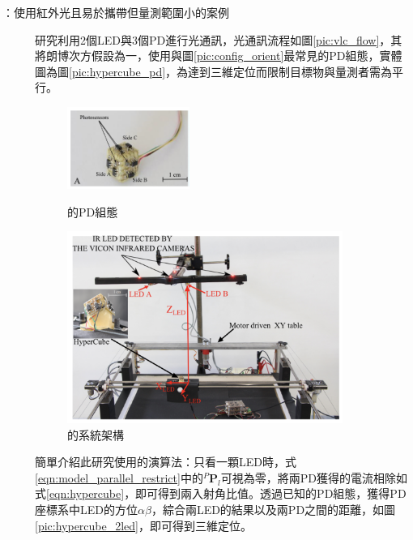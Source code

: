     \begin{description}
        \item[\cite{case:hypercube}：使用紅外光且易於攜帶但量測範圍小的案例]\hfill 
        
        \qquad
        \cite{case:hypercube}研究利用2個LED與3個PD進行光通訊，光通訊流程如圖\ref{pic:vlc_flow}，其將朗博次方假設為一，使用與圖\ref{pic:config_orient}最常見的PD組態，實體圖為圖\ref{pic:hypercube_pd}，為達到三維定位而限制目標物與量測者需為平行。

        \begin{figure}[!htb]
            \centering
            \begin{minipage}{.17\textwidth}
                \centering
                \includegraphics[width=4cm]{ch2pic/hypercube_pd.png}
                \caption{\cite{case:hypercube}的PD組態}
                \label{pic:hypercube_pd}
            \end{minipage}%
            \begin{minipage}{0.5\textwidth}
                \centering
                \includegraphics[width=9cm]{ch2pic/hypercube_setup.png}
                \caption{\cite{case:hypercube}的系統架構}
                \label{pic:hypercube_setup}
            \end{minipage}
        \end{figure}

        \qquad
        簡單介紹此研究使用的演算法：只看一顆LED時，式\ref{eqn:model_parallel_restrict}中的$^P\boldsymbol{P}_l$可視為零，將兩PD獲得的電流相除如式\ref{eqn:hypercube}，即可得到兩入射角比值。透過已知的PD組態，獲得PD座標系中LED的方位$\alpha\beta$，綜合兩LED的結果以及兩PD之間的距離，如圖\ref{pic:hypercube_2led}，即可得到三維定位。


\end{description}
